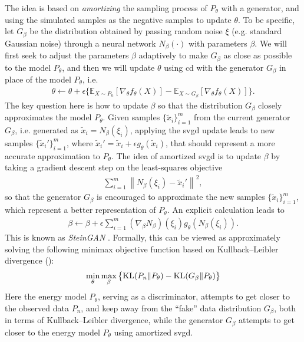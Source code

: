\documentclass[12pt,paper=letter]{scrreprt}
\def\mbb#1{\mathbb{#1}}
\def\E{\mbb{E}} %
\def\KL#1#2{\textnormal{KL}({#1}\Vert{#2})}
\begin{document}
The idea is based on \emph{amortizing} the sampling process of $P_\theta$ with a generator, and using the simulated samples as the negative samples to update $\theta$. 
To be specific, let $G_\beta$ be the distribution obtained by passing random noise $\xi$ (e.g. standard Gaussian noise) through a neural network $N_\beta(\cdot)$ with parameters $\beta$.
We will first seek to adjust the parameters $\beta$ adaptively to make $G_\beta$ as close as possible to the model $P_\theta$, and then we will update $\theta$ using \ac{cd} with the generator $G_\beta$ in place of the model $P_\theta$, i.e.
\begin{align}\label{equ:thetaG}
\theta \gets \theta + \epsilon \{ \E_{X \sim P_n}[\nabla_\theta f_\theta(X)] - \E_{X \sim G_\beta}[\nabla_\theta f_\theta(X)] \} .
\end{align}
The key question here is how to  update $\beta$ so that the distribution $G_\beta$ closely approximates the model $P_\theta$. 
Given samples $\{\tilde{x}_i\}_{i=1}^m$ from the current generator $G_\beta$, i.e. generated as $\tilde{x}_i = N_\beta(\xi_i)$, applying the \ac{svgd} update leads to new samples $\{\tilde{x}_i'\}_{i=1}^m$, where $\tilde{x}_i' = \tilde{x}_i + \epsilon g_\theta(\tilde{x}_i)$, that should represent a more accurate approximation to $P_\theta$. 
The idea of amortized \ac{svgd}  \citep{feng2017learning} is to update $\beta$ by taking a gradient descent step on the least-squares objective
\begin{align*}
\sum_{i=1}^m \left\| N_\beta(\xi_i) - \tilde{x}_i' \right\|^2 ,
\end{align*}
so that the generator $G_\beta$ is encouraged to approximate the new samples $\{\tilde{x}_i\}_{i=1}^m$, which represent a better representation of $P_\theta$.
An explicit calculation leads to
\begin{align}
\beta \gets \beta  + \epsilon \sum_{i=1}^m (\nabla_\beta N_\beta)(\xi_i) g_\theta(N_\beta(\xi_i)) .  \label{eq: LS fit NN}
\end{align}
This is known as \emph{SteinGAN} \citep{liu2017learning}. 
Formally, this can be
viewed as approximately solving the following minimax objective function based on Kullback--Leibler divergence ():   
\begin{align*}
\min_\theta \max_{\beta} \big\{ \KL{P_n}{P_\theta} - \KL{G_\beta}{P_\theta} \big \} 
\end{align*}
Here the energy model $P_\theta$, serving as a discriminator,  attempts to get closer to the observed data $P_n$, and keep away from the ``fake'' data distribution $G_\beta$, both in terms of  Kullback--Leibler divergence, while the generator $G_\beta$ attempts to get closer to the energy model $P_\theta$ using amortized \ac{svgd}. 
\end{document}
